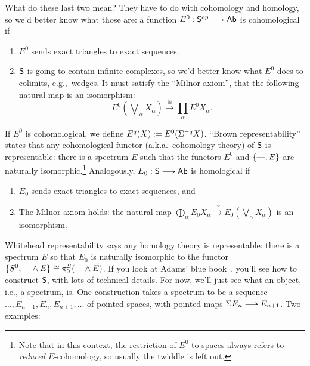 What do these last two mean?  They have to do with cohomology and homology, so we'd better know what those are: a function $E^0: \mathsf{S}^{op} \longrightarrow \mathsf{Ab}$ is cohomological if
\begin{enumerate}
\item $E^0$ sends exact triangles to exact sequences.
\item $\mathsf{S}$ is going to contain infinite complexes, so we'd better know what $E^0$ does to colimits, e.g.,\ wedges. It must satisfy the ``Milnor axiom'', that the following natural map is an isomorphism:
\[
E^0({\textstyle{\!\bigvee}_\alpha X_\alpha}) \stackrel{\cong}{\to} \prod_\alpha E^0 X_\alpha
.\]
\end{enumerate}
If $E^0$ is cohomological, we define $E^q (X) := E^0 (\Sigma^{-q} X)$. ``Brown representability'' states that any cohomological functor (a.k.a.\ cohomology theory) of $\mathsf{S}$ is representable: there is a spectrum $E$ such that the functors $E^0$ and $\{\textup{---}, E\}$ are naturally isomorphic.\footnote{Note that in this context, the restriction of $E^0$ to spaces always refers to \emph{reduced} $E$-cohomology, so usually the twiddle is left out.}  Analogously, $E_0: \mathsf{S} \longrightarrow \mathsf{Ab}$ is homological if
\begin{enumerate}
\item $E_0$ sends exact triangles to exact sequences, and
\item The Milnor axiom holds: the natural map $\bigoplus_\alpha E_0 X_\alpha \stackrel{\cong}{\to} E_0(\bigvee_\alpha X_\alpha)$ is an isomorphism.
\end{enumerate}
Whitehead representability says any homology theory is representable: there is a spectrum $E$ so that $E_0$ is naturally isomorphic to the functor $\{S^0, \text{---} \wedge E\} \cong \pi^S_0(\text{---} \wedge E)$.  If you look at Adams' blue book~\cite{Adams}, you'll see how to construct $\mathsf{S}$, with lots of technical details.  For now, we'll just see what an object, i.e., a spectrum, is.  One construction takes a spectrum to be a sequence $\ldots, E_{n-1}, E_n, E_{n+1}, \ldots$ of pointed spaces, with pointed maps $\Sigma E_n \longrightarrow E_{n+1}$.  Two examples:
